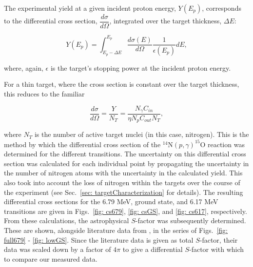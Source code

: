 The experimental yield at a given incident proton energy, $Y(E_{p})$, corresponds to the differential cross section, $\dfrac{d \sigma}{d \Omega}$, integrated over the target thickness, $\Delta E$:

\begin{equation}
Y(E_{p}) = \int_{E_{p} - \Delta E}^{E_{p}} \dfrac{d \sigma(E)}{d \Omega} \dfrac{1}{\epsilon(E_{p})} dE,
\label{eqn: yieldCS}
\end{equation}

\noindent where, again, $\epsilon$ is the target's stopping power at the incident proton energy. 

For a thin target, where the cross section is constant over the target thickness, this reduces to the familiar 

\begin{equation}
\dfrac{d \sigma}{d \Omega} = \dfrac{Y}{N_{T}} = \dfrac{N_{\gamma}C_{in}} {\eta  N_{p} C_{out} N_{T}},
\label{eqn: thinTargetCS}
\end{equation}

\noindent where $N_{T}$ is the number of active target nuclei (in this case, nitrogen). This is the method by which the differential cross section of the $^{14}$N$\left( p,\gamma \right) ^{15}$O reaction was determined for the different transitions. The uncertainty on this differential cross section was calculated for each individual point by propagating the uncertainty in the number of nitrogen atoms with the uncertainty in the calculated yield. This also took into account the loss of nitrogen within the targets over the course of the experiment (see Sec.\ \ref{sec: targetCharacterization} for details). The resulting differential cross sections for the 6.79 MeV, ground state, and 6.17 MeV transitions are given in Figs.\ \ref{fig: cs679}, \ref{fig: csGS}, and \ref{fig: cs617}, respectively. From these calculations, the astrophysical $S$-factor was subsequently determined. These are shown, alongside literature data from \cite{Schroder1987, Imbriani2005, Runkle2005, Li2016}, in the series of Figs.\ \ref{fig: full679} - \ref{fig: lowGS}. Since the literature data is given as total $S$-factor, their data was scaled down by a factor of $4\pi$ to give a differential $S$-factor with which to compare our measured data.




